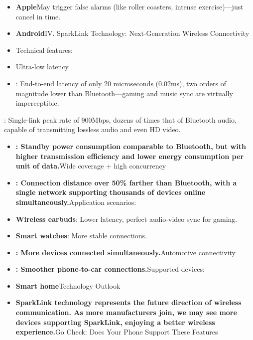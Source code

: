 \begin{itemize}
  \item \textbf{Apple}May trigger false alarms (like roller coasters, intense exercise)—just cancel in time.
  \item \textbf{Android}IV. SparkLink Technology: Next-Generation Wireless Connectivity
\end{itemize}


\begin{itemize}
  \item Technical features:
  \item Ultra-low latency
  \item : End-to-end latency of only 20 microseconds (0.02ms), two orders of magnitude lower than Bluetooth—gaming and music sync are virtually imperceptible.
\end{itemize}


: Single-link peak rate of 900Mbps, dozens of times that of Bluetooth audio, capable of transmitting lossless audio and even HD video.


\begin{itemize}
  \item \textbf{: Standby power consumption comparable to Bluetooth, but with higher transmission efficiency and lower energy consumption per unit of data.}Wide coverage + high concurrency
  \item \textbf{: Connection distance over 50\% farther than Bluetooth, with a single network supporting thousands of devices online simultaneously.}Application scenarios:
  \item \textbf{Wireless earbuds}: Lower latency, perfect audio-video sync for gaming.
  \item \textbf{Smart watches}: More stable connections.
\end{itemize}


\begin{itemize}
  \item \textbf{: More devices connected simultaneously.}Automotive connectivity
  \item \textbf{: Smoother phone-to-car connections.}Supported devices:
  \item \textbf{Smart home}Technology Outlook
  \item \textbf{SparkLink technology represents the future direction of wireless communication. As more manufacturers join, we may see more devices supporting SparkLink, enjoying a better wireless experience.}Go Check: Does Your Phone Support These Features
\end{itemize}

